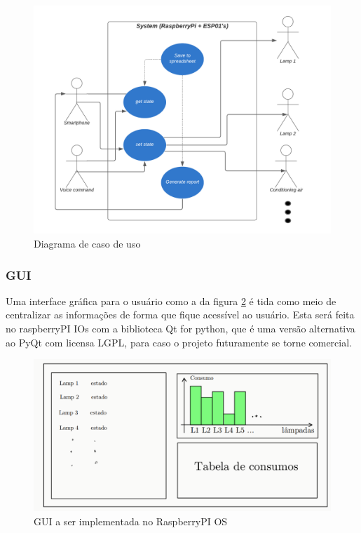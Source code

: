 \documentclass[11pt]{article}
\begin{document}
\begin{figure}[h!]
\caption{\label{fig:caso_de_uso}Diagrama de caso de uso}
\centering
\includegraphics[width=\textwidth]{diagrama_uso.png}
\end{figure}


\subsubsection{GUI}
\label{sec:orgf24a71f}
Uma interface gráfica para o usuário como a da figura \ref{fig:gui} é tida como meio de centralizar as informações de forma que fique acessível ao usuário. Esta será feita no raspberryPI IOs com a biblioteca Qt for python, que é uma versão alternativa ao PyQt com licensa LGPL, para caso o projeto futuramente se torne comercial.
\begin{figure}[h!]
\caption{\label{fig:gui}GUI a ser implementada no RaspberryPI OS}
\centering
\includegraphics[width=\textwidth]{./gui.png}
\end{figure}
\end{document}
